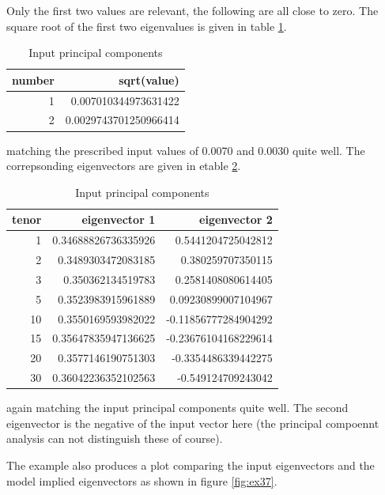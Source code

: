 Only the first two values are relevant, the following are all close to zero. The square root of the first two
eigenvalues is given in table \ref{tab:ex37_3}.

\begin{table}[hbt]
\begin{center}
\begin{tabular}{r|r}
number & sqrt(value)                \\
\hline      
1      & 0.007010344973631422       \\
2      & 0.0029743701250966414      \\
\end{tabular}
\caption{Input principal components}
\label{tab:ex37_3}
\end{center}
\end{table}

matching the prescribed input values of 0.0070 and 0.0030 quite well. The correpsonding eigenvectors are given in etable
\ref{tab:ex37_4}.

\begin{table}[hbt]
\begin{center}
\begin{tabular}{r|r|r}
tenor & eigenvector 1       & eigenvector 2       \\
\hline      
1     & 0.34688826736335926 & 0.5441204725042812  \\
2     & 0.3489303472083185  & 0.380259707350115   \\
3     & 0.350362134519783   & 0.2581408080614405  \\
5     & 0.3523983915961889  & 0.09230899007104967 \\
10    & 0.3550169593982022  & -0.11856777284904292\\
15    & 0.35647835947136625 & -0.23676104168229614\\
20    & 0.3577146190751303  & -0.3354486339442275 \\
30    & 0.36042236352102563 & -0.549124709243042  \\
\end{tabular}
\caption{Input principal components}
\label{tab:ex37_4}
\end{center}
\end{table}

again matching the input principal components quite well. The second eigenvector is the negative of the input vector
here (the principal compoennt analysis can not distinguish these of course).

The example also produces a plot comparing the input eigenvectors and the model implied eigenvectors as shown in figure \ref{fig:ex37}.

